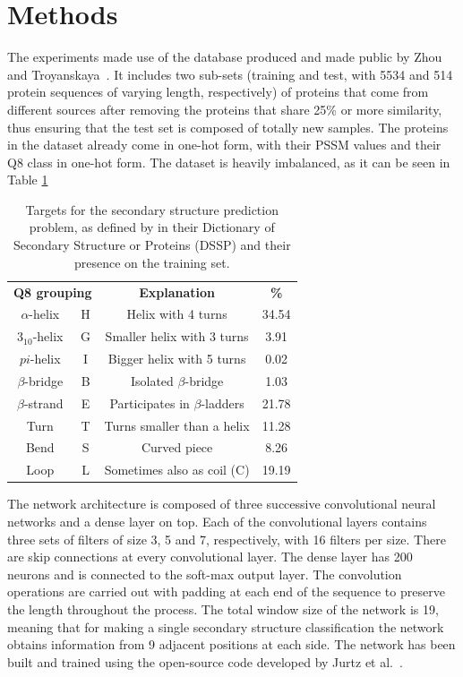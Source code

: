 \documentclass{article}
\begin{document}
\section{Methods}
\label{sec:methods}

The experiments made use of the database produced and made public by Zhou and Troyanskaya~\cite{Zhou2014}. It includes two sub-sets (training and test, with 5534 and 514 protein sequences of varying length, respectively) of proteins that come from different sources after removing the proteins that share 25\% or more similarity, thus ensuring that the test set is composed of totally new samples. The proteins in the dataset already come in one-hot form, with their PSSM values and their Q8 class in one-hot form. The dataset is heavily imbalanced, as it can be seen in Table \ref{table:q8}

\begin{table}
	\begin{tabular}{cc|c|c}
		\multicolumn{2}{c}{\textbf{Q8 grouping}} &  \textbf{Explanation} & \textbf{\%}\\ 
		$\alpha$-helix & H & Helix with 4 turns & 34.54 \\ 
		$3_{10}$-helix & G & Smaller helix with 3 turns & 3.91 \\ 
		$pi$-helix      & I & Bigger helix with 5 turns & 0.02 \\ \hline
		$\beta$-bridge & B & Isolated $\beta$-bridge & 1.03 \\ 
		$\beta$-strand & E & Participates in $\beta$-ladders & 21.78\\ \hline
		Turn & T & Turns smaller than a helix & 11.28 \\ 
		Bend & S & Curved piece & 8.26 \\ 
		Loop & L & Sometimes also as coil (C) & 19.19
	\end{tabular}
	\caption{Targets for the secondary structure prediction problem, as defined by \cite{Kabsch1983} in their Dictionary of Secondary Structure or Proteins (DSSP) and their presence on the training set.}
	\label{table:q8}
\end{table}

The network architecture is composed of three successive convolutional neural networks and a dense layer on top. Each of the convolutional layers contains three sets of filters of size 3, 5 and 7, respectively, with 16 filters per size. There are skip connections at every convolutional layer. The dense layer has 200 neurons and is connected to the soft-max output layer. The convolution operations are carried out with padding at each end of the sequence to preserve the length throughout the process. The total window size of the network is 19, meaning that for making a single secondary structure classification the network obtains information from 9 adjacent positions at each side. The network has been built and trained using the open-source code developed by Jurtz et al.~\cite{Jurtz2017}.
\end{document}
